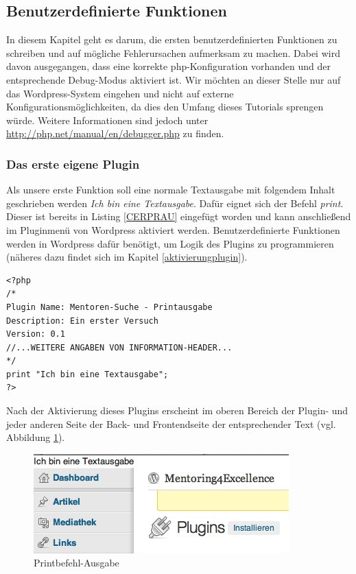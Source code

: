 \subsection{Benutzerdefinierte Funktionen}\label{benutzerdeffunkt}
In diesem Kapitel geht es darum, die ersten benutzerdefinierten Funktionen zu schreiben und auf mögliche Fehlerursachen aufmerksam zu machen. Dabei wird davon ausgegangen, dass eine korrekte php-Konfiguration vorhanden und der entsprechende Debug-Modus aktiviert ist. Wir möchten an dieser Stelle nur auf das Wordpress-System eingehen und  nicht auf externe Konfigurationsmöglichkeiten, da dies den Umfang dieses Tutorials sprengen würde. Weitere Informationen sind jedoch unter \url{http://php.net/manual/en/debugger.php} zu finden.
\subsubsection{Das erste eigene Plugin}
Als unsere erste Funktion soll eine normale Textausgabe mit folgendem Inhalt geschrieben werden \emph{Ich bin eine Textausgabe}. Dafür eignet sich der Befehl \emph{print}. Dieser ist bereits in Listing \ref{CERPRAU} eingefügt worden und kann anschließend im Pluginmenü von Wordpress aktiviert werden. Benutzerdefinierte Funktionen werden in Wordpress dafür benötigt, um Logik des Plugins zu programmieren (näheres dazu findet sich im Kapitel \ref{aktivierungplugin}).
\begin{lstlisting}
<?php
/*
Plugin Name: Mentoren-Suche - Printausgabe
Description: Ein erster Versuch
Version: 0.1
//...WEITERE ANGABEN VON INFORMATION-HEADER...
*/
print "Ich bin eine Textausgabe";
?>
\end{lstlisting} 
Nach der Aktivierung dieses Plugins erscheint im oberen Bereich der Plugin- und jeder anderen Seite der Back- und Frontendseite der entsprechender Text (vgl. Abbildung \ref{img:PRBEAUS}). 
\newpage
 \begin{figure}[!htbp]
	\begin{center}
		\includegraphics[angle={360}, scale=0.61]{pictures/printheader.png}
	    \caption{Printbefehl-Ausgabe}
	    \label{img:PRBEAUS}
	    	\end{center}
   \end{figure}

